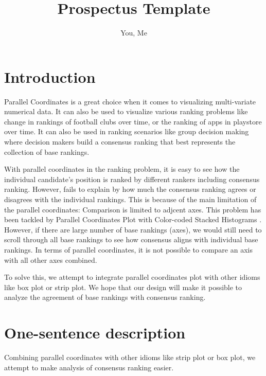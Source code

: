 \documentclass{proc}
\begin{document}
\title{Prospectus Template}

\author{You, Me}

\maketitle

\section{Introduction}


Parallel Coordinates is a great choice when it comes to visualizing multi-variate numerical data. It can also be used to visualize various ranking problems like change in rankings of football clubs over time, or the ranking of apps in playstore over time. It can also be used in ranking scenarios like group decision making where decision makers build a consensus ranking that best represents the collection of base rankings.

With parallel coordinates in the ranking problem, it is easy to see how the individual candidate's position is ranked by different rankers including consensus ranking. However, fails to explain by how much the consensus ranking agrees or disagrees with the individual rankings. This is because of the main limitation of the parallel coordinates: Comparison is limited to adjcent axes. This problem has been tackled by Parallel Coordinates Plot with Color-coded Stacked Histograms \cite{php}. However, if there are large number of base rankings (axes), we would still need to scroll through all base rankings to see how consensus aligns with individual base rankings. In terms of parallel coordinates, it is not possible to compare an axis with all other axes combined.

To solve this, we attempt to integrate parallel coordinates plot with other idioms like box plot or strip plot. We hope that our design will make it possible to analyze the agreement of base rankings with consensus ranking. 

% 

\section{One-sentence description}
Combining parallel coordinates with other idioms like strip plot or box plot, we attempt to make analysis of consensus ranking easier.
\end{document}
